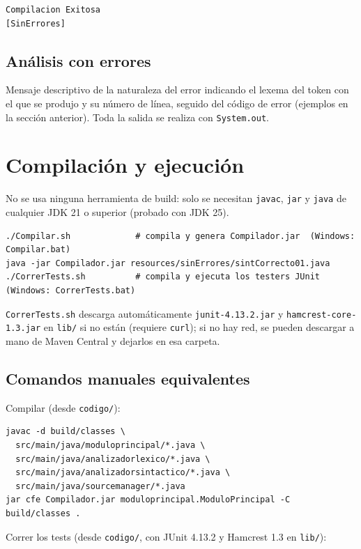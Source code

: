 \documentclass[11pt,a4paper]{article}
\begin{document}
\begin{verbatim}
Compilacion Exitosa
[SinErrores]
\end{verbatim}

\subsection{Análisis con errores}

Mensaje descriptivo de la naturaleza del error indicando el lexema del token con el que se
produjo y su número de línea, seguido del código de error (ejemplos en la sección
anterior). Toda la salida se realiza con \texttt{System.out}.

\section{Compilación y ejecución}

No se usa ninguna herramienta de build: solo se necesitan \texttt{javac}, \texttt{jar} y
\texttt{java} de cualquier JDK 21 o superior (probado con JDK 25).

{\footnotesize
\begin{verbatim}
./Compilar.sh             # compila y genera Compilador.jar  (Windows: Compilar.bat)
java -jar Compilador.jar resources/sinErrores/sintCorrecto01.java
./CorrerTests.sh          # compila y ejecuta los testers JUnit  (Windows: CorrerTests.bat)
\end{verbatim}
}

\texttt{CorrerTests.sh} descarga automáticamente \texttt{junit-4.13.2.jar} y
\texttt{hamcrest-core-1.3.jar} en \texttt{lib/} si no están (requiere \texttt{curl});
si no hay red, se pueden descargar a mano de Maven Central y dejarlos en esa carpeta.

\subsection{Comandos manuales equivalentes}

Compilar (desde \texttt{codigo/}):

{\footnotesize
\begin{verbatim}
javac -d build/classes \
  src/main/java/moduloprincipal/*.java \
  src/main/java/analizadorlexico/*.java \
  src/main/java/analizadorsintactico/*.java \
  src/main/java/sourcemanager/*.java
jar cfe Compilador.jar moduloprincipal.ModuloPrincipal -C build/classes .
\end{verbatim}
}

Correr los tests (desde \texttt{codigo/}, con JUnit 4.13.2 y Hamcrest 1.3 en \texttt{lib/}):
\end{document}
